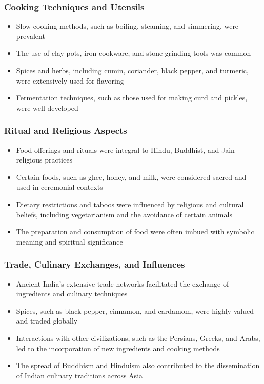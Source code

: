 \begin{frame}[fragile]\frametitle{Cooking Techniques and Utensils}
    \begin{itemize}
        \item Slow cooking methods, such as boiling, steaming, and simmering, were prevalent
        \item The use of clay pots, iron cookware, and stone grinding tools was common
        \item Spices and herbs, including cumin, coriander, black pepper, and turmeric, were extensively used for flavoring
        \item Fermentation techniques, such as those used for making curd and pickles, were well-developed
    \end{itemize}
\end{frame}

\begin{frame}[fragile]\frametitle{Ritual and Religious Aspects}
    \begin{itemize}
        \item Food offerings and rituals were integral to Hindu, Buddhist, and Jain religious practices
        \item Certain foods, such as ghee, honey, and milk, were considered sacred and used in ceremonial contexts
        \item Dietary restrictions and taboos were influenced by religious and cultural beliefs, including vegetarianism and the avoidance of certain animals
        \item The preparation and consumption of food were often imbued with symbolic meaning and spiritual significance
    \end{itemize}
\end{frame}

\begin{frame}[fragile]\frametitle{Trade, Culinary Exchanges, and Influences}
    \begin{itemize}
        \item Ancient India's extensive trade networks facilitated the exchange of ingredients and culinary techniques
        \item Spices, such as black pepper, cinnamon, and cardamom, were highly valued and traded globally
        \item Interactions with other civilizations, such as the Persians, Greeks, and Arabs, led to the incorporation of new ingredients and cooking methods
        \item The spread of Buddhism and Hinduism also contributed to the dissemination of Indian culinary traditions across Asia
    \end{itemize}
\end{frame}

